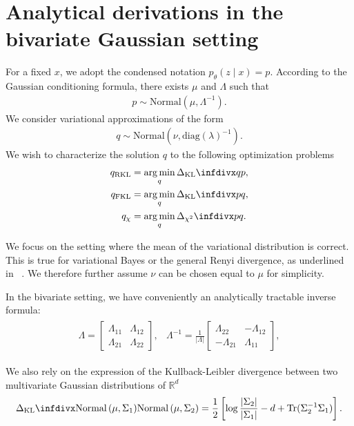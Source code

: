 \setcounter{section}{0}
\renewcommand{\thesection}{\thechapter.\Alph{section}}

\section{Analytical derivations in the bivariate Gaussian setting}
\label{app:biv_gauss}
For a fixed $x$, we adopt the condensed notation $p_\theta(z \mid x) = p$. According to the Gaussian conditioning formula, there exists $\mu$ and $\Lambda$ such that 
\begin{align}
    p \sim \mathrm{Normal}\left(\mu, \Lambda^{-1}\right).
\end{align}
We consider variational approximations of the form
\begin{align}
    q \sim \mathrm{Normal}\left(\nu, \textrm{diag}(\lambda)^{-1}\right).
\end{align}
We wish to characterize the solution $q$ to the following optimization problems
\begin{align}
    q_{\textrm{RKL}} &= \argmin_{q}\kl{q}{p}, \\
    q_{\textrm{FKL}} &= \argmin_{q}\kl{p}{q}, \\
    q_\chi &= \argmin_{q}\chidiv{p}{q}.
\end{align}

We focus on the setting where the mean of the variational distribution is correct. This is true for variational Bayes or the general Renyi divergence, as underlined in ~\cite{NIPS2016_6208}. We therefore further assume $\nu$ can be chosen equal to $\mu$ for simplicity. 

In the bivariate setting, we have conveniently an analytically tractable inverse formula:
\begin{align}
\begin{array}{cc}
    \Lambda = \begin{bmatrix}
    \Lambda_{11}       & \Lambda_{12} \\
    \Lambda_{21}       & \Lambda_{22} 
\end{bmatrix},&
    \Lambda^{-1} = \frac{1}{|\Lambda|} \begin{bmatrix}
    \Lambda_{22}       & -\Lambda_{12} \\
    -\Lambda_{21}       & \Lambda_{11} 
\end{bmatrix},
\end{array}
\end{align}

We also rely on the expression of the Kullback-Leibler divergence between two multivariate Gaussian distributions of $\mathbb{R}^d$
\begin{align}
    \kl{\textrm{Normal}\left(\mu, \Sigma_1\right)}{ \textrm{Normal}\left(\mu, \Sigma_2\right)} = \frac{1}{2}\left[\log\frac{|\Sigma_2|}{|\Sigma_1|} - d + \textrm{Tr}(\Sigma_2^{-1}\Sigma_1)\right].
\end{align}

